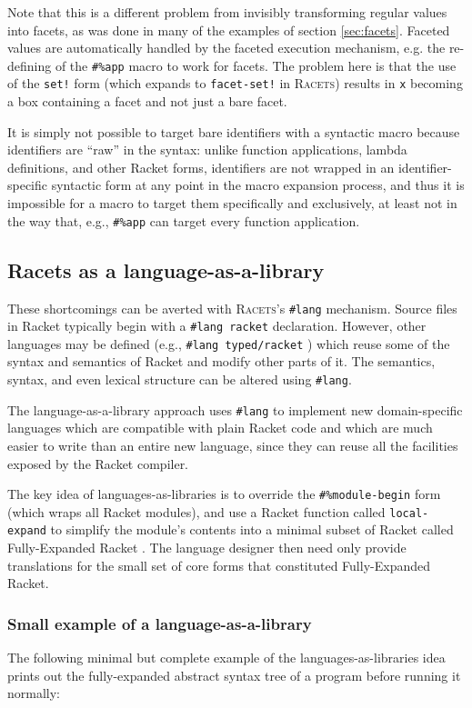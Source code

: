 \documentclass{article}
\begin{document}
Note that this is a different problem from invisibly transforming regular values into facets, as was done in many of the examples of section \ref{sec:facets}. Faceted values are automatically handled by the faceted execution mechanism, e.g. the re-defining of the \texttt{\#\%app} macro to work for facets. The problem here is that the use of the \texttt{set!} form (which expands to \texttt{facet-set!} in \textsc{Racets}) results in \texttt{x} becoming a box containing a facet and not just a bare facet.

It is simply not possible to target bare identifiers with a syntactic macro because identifiers are ``raw'' in the syntax: unlike function applications, lambda definitions, and other Racket forms, identifiers are not wrapped in an identifier-specific syntactic form at any point in the macro expansion process, and thus it is impossible for a macro to target them specifically and exclusively, at least not in the way that, e.g., \texttt{\#\%app} can target every function application.


\subsection{Racets as a language-as-a-library}
These shortcomings can be averted with \textsc{Racets}'s \texttt{\#lang} mechanism. Source files in Racket typically begin with a \texttt{\#lang racket} declaration. However, other languages may be defined (e.g., \texttt{\#lang typed/racket} \cite{typed-racket}) which reuse some of the syntax and semantics of Racket and modify other parts of it. The semantics, syntax, and even lexical structure can be altered using \texttt{\#lang}.

The language-as-a-library approach \cite{typed-racket} uses \texttt{\#lang} to implement new domain-specific languages which are compatible with plain Racket code and which are much easier to write than an entire new language, since they can reuse all the facilities exposed by the Racket compiler.

The key idea of languages-as-libraries is to override the \texttt{\#\%module-begin} form (which wraps all Racket modules), and use a Racket function called \texttt{local-expand} to simplify the module's contents into a minimal subset of Racket called Fully-Expanded Racket \cite{fe-racket}. The language designer then need only provide translations for the small set of core forms that constituted Fully-Expanded Racket.


\subsubsection{Small example of a language-as-a-library}
The following minimal but complete example of the languages-as-libraries idea prints out the fully-expanded abstract syntax tree of a program before running it normally:
\end{document}
